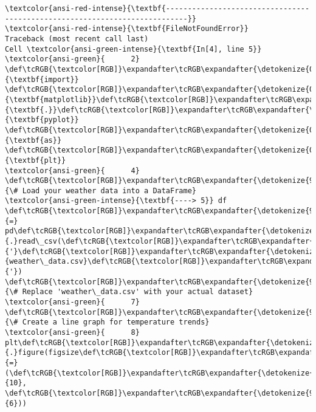 \documentclass[11pt]{article}
\begin{document}
    \begin{Verbatim}[commandchars=\\\{\}, frame=single, framerule=2mm, rulecolor=\color{outerrorbackground}]
\textcolor{ansi-red-intense}{\textbf{---------------------------------------------------------------------------}}
\textcolor{ansi-red-intense}{\textbf{FileNotFoundError}}                         Traceback (most recent call last)
Cell \textcolor{ansi-green-intense}{\textbf{In[4], line 5}}
\textcolor{ansi-green}{      2} \def\tcRGB{\textcolor[RGB]}\expandafter\tcRGB\expandafter{\detokenize{0,135,0}}{\textbf{import}} \def\tcRGB{\textcolor[RGB]}\expandafter\tcRGB\expandafter{\detokenize{0,0,255}}{\textbf{matplotlib}}\def\tcRGB{\textcolor[RGB]}\expandafter\tcRGB\expandafter{\detokenize{0,0,255}}{\textbf{.}}\def\tcRGB{\textcolor[RGB]}\expandafter\tcRGB\expandafter{\detokenize{0,0,255}}{\textbf{pyplot}} \def\tcRGB{\textcolor[RGB]}\expandafter\tcRGB\expandafter{\detokenize{0,135,0}}{\textbf{as}} \def\tcRGB{\textcolor[RGB]}\expandafter\tcRGB\expandafter{\detokenize{0,0,255}}{\textbf{plt}}
\textcolor{ansi-green}{      4} \def\tcRGB{\textcolor[RGB]}\expandafter\tcRGB\expandafter{\detokenize{95,135,135}}{\# Load your weather data into a DataFrame}
\textcolor{ansi-green-intense}{\textbf{----> 5}} df \def\tcRGB{\textcolor[RGB]}\expandafter\tcRGB\expandafter{\detokenize{98,98,98}}{=} pd\def\tcRGB{\textcolor[RGB]}\expandafter\tcRGB\expandafter{\detokenize{98,98,98}}{.}read\_csv(\def\tcRGB{\textcolor[RGB]}\expandafter\tcRGB\expandafter{\detokenize{175,0,0}}{'}\def\tcRGB{\textcolor[RGB]}\expandafter\tcRGB\expandafter{\detokenize{175,0,0}}{weather\_data.csv}\def\tcRGB{\textcolor[RGB]}\expandafter\tcRGB\expandafter{\detokenize{175,0,0}}{'})  \def\tcRGB{\textcolor[RGB]}\expandafter\tcRGB\expandafter{\detokenize{95,135,135}}{\# Replace 'weather\_data.csv' with your actual dataset}
\textcolor{ansi-green}{      7} \def\tcRGB{\textcolor[RGB]}\expandafter\tcRGB\expandafter{\detokenize{95,135,135}}{\# Create a line graph for temperature trends}
\textcolor{ansi-green}{      8} plt\def\tcRGB{\textcolor[RGB]}\expandafter\tcRGB\expandafter{\detokenize{98,98,98}}{.}figure(figsize\def\tcRGB{\textcolor[RGB]}\expandafter\tcRGB\expandafter{\detokenize{98,98,98}}{=}(\def\tcRGB{\textcolor[RGB]}\expandafter\tcRGB\expandafter{\detokenize{98,98,98}}{10}, \def\tcRGB{\textcolor[RGB]}\expandafter\tcRGB\expandafter{\detokenize{98,98,98}}{6}))


\end{Verbatim}
\end{document}

